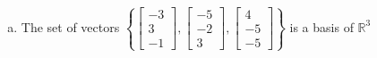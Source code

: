 \begin{exerciseAnswer}
\begin{enumerate}[(a)]
\item The set of vectors \( \left\{ \left[\begin{array}{c}
-3 \\
3 \\
-1
\end{array}\right] , \left[\begin{array}{c}
-5 \\
-2 \\
3
\end{array}\right] , \left[\begin{array}{c}
4 \\
-5 \\
-5
\end{array}\right] \right\} \) is a basis of \(\mathbb{R}^3\)
\end{enumerate}
    
\end{exerciseAnswer}
    
